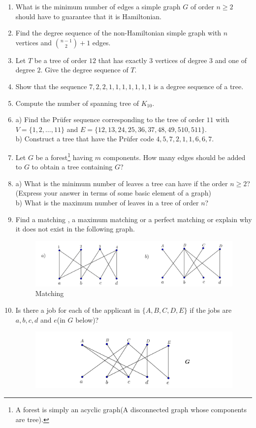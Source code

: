 \documentclass[paper=a4, fontsize=11pt,twoside]{scrartcl}		%
\theoremstyle{definition}
\theoremstyle{remark}
\begin{document}
\begin{enumerate}
  \item What is the minimum number of edges a simple graph $G$ of order $n\geq2$ should have to guarantee that it is Hamiltonian.
  \item Find the degree sequence of the non-Hamiltonian simple graph with $n$ vertices and $\binom{n-1}{2}+1$ edges.
  \item Let $T$ be a tree of order $12$ that has exactly $3$ vertices of degree $3$ and one of degree $2$. Give the degree sequence of $T$.
  \item Show that the sequence $7,2,2,1,1,1,1,1,1,1$ is a degree sequence of a tree.
  \item Compute the number of spanning tree of $K_{10}$.
  \item a) Find the Pr\"{u}fer sequence corresponding to the tree of order $11$ with $V=\{1,2,\ldots,11\}$ and $E=\{12,13,24,25,36,37,48,49,510,511\}$.\\
        b) Construct a tree that have the Pr\"{u}fer code $4,5,7,2,1,1,6,6,7$.
  \item Let $G$ be a forest\footnote{A forest is simply an acyclic graph(A disconnected graph whose components are tree).} having $m$ components. How many edges should be added to $G$ to obtain a tree containing $G$?
  \item a) What is the minimum number of leaves a tree can have if the order $n\ge2$?(Express your answer in terms of some basic element of a graph)\\
      b) What is the maximum number of leaves in a tree of order $n$?
  \newpage
  \item Find a matching , a maximum matching or a perfect matching or explain why it does not exist in the following graph.
  \begin{figure}[hbt!]
\centering
\includegraphics[width=1.0\textwidth]{GrapAss5.png}
\caption{Matching}\label{fig5}
\end{figure}
  \item Is there a job for each of the applicant in $\{A,B,C,D,E\}$ if the jobs are $a,b,c,d$ and $e$(in $G$ below)?
    \begin{figure}[hbt!]
\centering
\includegraphics[width=1.0\textwidth]{GrapAss6.png}

\end{figure}
\end{enumerate}
\end{document}
